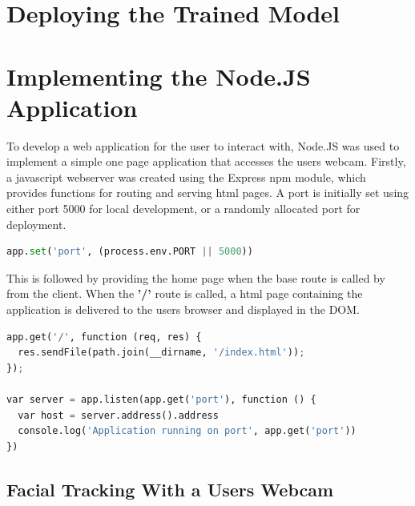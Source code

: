 \section{Deploying the Trained Model}

\section{Implementing the Node.JS Application}
To develop a web application for the user to interact with, Node.JS was used to implement a simple one page application that accesses the users webcam. Firstly, a javascript webserver was created using the Express npm module, which provides functions for routing and serving html pages. A port is initially set using either port 5000 for local development, or a randomly allocated port for deployment. 

\begin{lstlisting}[language=python, frame=single]
	app.set('port', (process.env.PORT || 5000))
\end{lstlisting}

This is followed by providing the home page when the base route is called by from the client. When the \textbf{'/'} route is called, a html page containing the application is delivered to the users browser and displayed in the DOM.

\begin{lstlisting}[language=python, frame=single]
app.get('/', function (req, res) {
  res.sendFile(path.join(__dirname, '/index.html'));
});

var server = app.listen(app.get('port'), function () {
  var host = server.address().address
  console.log('Application running on port', app.get('port'))
})
\end{lstlisting}

\subsection{Facial Tracking With a Users Webcam}

